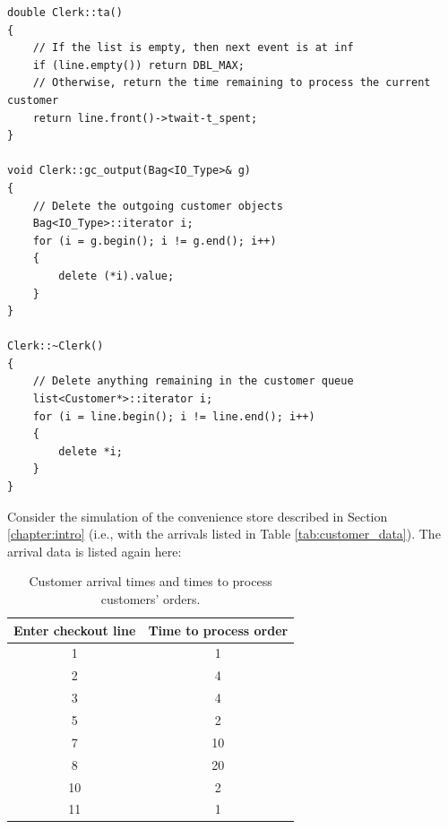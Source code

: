 \begin{verbatim}
double Clerk::ta()
{
    // If the list is empty, then next event is at inf
    if (line.empty()) return DBL_MAX;
    // Otherwise, return the time remaining to process the current customer
    return line.front()->twait-t_spent;
}

void Clerk::gc_output(Bag<IO_Type>& g)
{
    // Delete the outgoing customer objects
    Bag<IO_Type>::iterator i;
    for (i = g.begin(); i != g.end(); i++)
    {
        delete (*i).value;
    }
}

Clerk::~Clerk()
{
    // Delete anything remaining in the customer queue
    list<Customer*>::iterator i;
    for (i = line.begin(); i != line.end(); i++)
    {
        delete *i;
    }
}
\end{verbatim}

Consider the simulation of the convenience store described in Section \ref{chapter:intro} (i.e., with the arrivals listed in Table \ref{tab:customer_data}). The arrival data is listed again here:
\begin{table}[h]
\centering
\begin{tabular}{|c|c|}
\hline
Enter checkout line & Time to process order \\ \hline
1 & 1 \\ \hline
2 & 4 \\ \hline
3 & 4 \\ \hline
5 & 2 \\ \hline
7 & 10 \\ \hline
8 & 20 \\ \hline
10 & 2 \\ \hline
11 & 1 \\ \hline
\end{tabular}
\caption{Customer arrival times and times to process customers' orders.}
\label{tab:customer_data_again}
\end{table}

